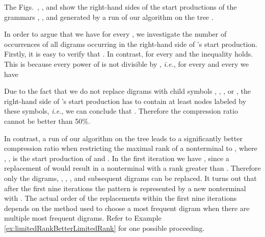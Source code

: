 \documentclass[12pt]{llncs}
\newcommand{\tp}{digram\xspace}
\newcommand{\tps}{digrams\xspace}
\newcommand{\hairsp}{\hspace{1pt}}\newcommand{\TODO}{\textcolor{red}{\bf TODO!}\xspace}
\newcommand{\ie}{\mbox{\textit{i.\hairsp{}e.}}\xspace}
\begin{document}
\begin{example}
The Figs.~, ,  and  show the right-hand sides of the start productions of the grammars , ,  and  generated by a run of our algorithm on the tree .
\end{example}
In order to argue that we have  for every , we investigate the number of occurrences of all \tps occurring in the right-hand side of 's start production. Firstly, it is easy to verify that . In contrast, for every  and  the inequality  holds. This is because every power of  is not divisible by , \ie, for every  and every  we have 

Due to the fact that we do not replace \tps with child symbols , , ,  or , the right-hand side of 's start production has to contain at least  nodes labeled by these symbols, \ie, we can conclude that . Therefore the compression ratio cannot be better than 50\%.

In contrast, a run  of our
algorithm on the tree  leads to a significantly better compression ratio 
when restricting the maximal rank of a nonterminal to , where 
\mbox{}, \mbox{},
 is the start production of  and
. In the first iteration we have
, since a replacement of 
would result in a nonterminal with a rank greater than . Therefore
only the \tps , , , , 
and subsequent \tps can be replaced. It turns out that after the first
nine iterations the pattern  is
represented by a new nonterminal  with
. The actual order of the replacements within
the first nine iterations depends on the method used to choose a most
frequent \tp when there are multiple most frequent \tps. Refer to
Example \ref{ex:limitedRankBetterLimitedRank} for one possible proceeding.
\end{document}
